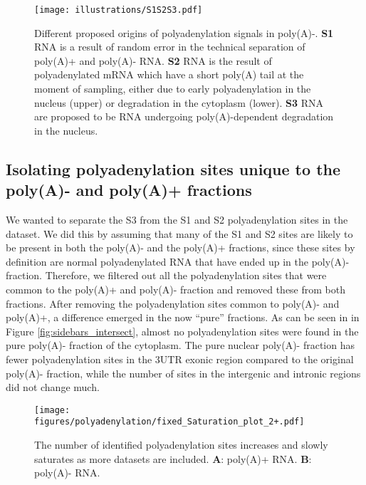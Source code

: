 \begin{figure}[hb]
	\begin{center}
		\texttt{[image: illustrations/S1S2S3.pdf]}
	\end{center}
	\caption{Different proposed origins of polyadenylation signals in poly(A)-.
	\textbf{S1} RNA is a result of random error in the technical separation of poly(A)+
	and poly(A)- RNA. \textbf{S2} RNA is the result of polyadenylated mRNA which have a
	short poly(A) tail at the moment of sampling, either due to early
	polyadenylation in the nucleus (upper) or degradation in the cytoplasm
	(lower). \textbf{S3} RNA are proposed to be RNA undergoing
	poly(A)-dependent degradation in the nucleus.}
	\label{fig:S123}
\end{figure}

\subsection{Isolating polyadenylation sites unique to the poly(A)- and poly(A)+
fractions}
We wanted to separate the S3 from the S1 and S2 polyadenylation sites in the dataset.
We did this by assuming that many of the S1 and S2 sites are likely to be
present in both the poly(A)- and the poly(A)+ fractions, since these sites by
definition are normal polyadenylated RNA that have ended up in the poly(A)-
fraction. Therefore, we filtered out all the polyadenylation sites that were common to
the poly(A)+ and poly(A)- fraction and removed these from both fractions. After
removing the polyadenylation sites common to poly(A)- and poly(A)+, a difference
emerged in the now ``pure'' fractions. As can be seen in in Figure
\ref{fig:sidebars_intersect}, almost no polyadenylation sites were found in the pure
poly(A)- fraction of the cytoplasm. The pure nuclear poly(A)- fraction has
fewer polyadenylation sites in the 3\ppp UTR exonic region compared to the
original poly(A)- fraction, while the number of sites in the intergenic and
intronic regions did not change much.

\begin{figure}[hb]
	\begin{center}
		\texttt{[image: figures/polyadenylation/fixed\_Saturation\_plot\_2+.pdf]}
	\end{center}
	\caption{The number of identified polyadenylation sites increases and
	slowly saturates as more datasets are included. \textbf{A}: poly(A)+
	RNA. \textbf{B}: poly(A)- RNA.}
	\label{fig:saturation}
\end{figure}

